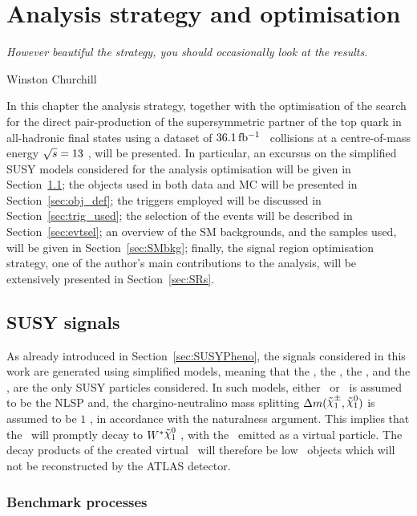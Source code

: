 \chapter{Analysis strategy and optimisation}
\label{ch:stop_ana}
\epigraph{\emph{However beautiful the strategy, you should occasionally look at the results.}}{Winston Churchill}

	In this chapter the analysis strategy, together with the optimisation of the search for the direct pair-production of the supersymmetric partner of the top quark in all-hadronic final states using a dataset of $36.1\, \mbox{fb$^{-1}$}$ \pp\ collisions at a centre-of-mass energy $\sqrt{s} = 13$ \TeV, will be presented. In particular, an excursus on the simplified \ac{SUSY} models considered for the analysis optimisation will be given in Section~\ref{sec:susysig}; the objects used in both data and \ac{MC} will be presented in Section~\ref{sec:obj_def}; the triggers employed will be discussed in Section~\ref{sec:trig_used}; the selection of the events will be described in Section~\ref{sec:evtsel}; an overview of the \ac{SM} backgrounds, and the samples used, will be given in Section~\ref{sec:SMbkg}; finally, the signal region optimisation strategy, one of the author's main contributions to the analysis, will be extensively presented in Section~\ref{sec:SRs}.


	\section{SUSY signals}
	\label{sec:susysig}

		As already introduced in Section~\ref{sec:SUSYPheno}, the signals considered in this work are generated using simplified models, meaning that the \stop, the \ninoone, the \ninotwo, and the \chinoonepm, are the only \ac{SUSY} particles considered. In such models, either \ninotwo\ or \chinoonepm\ is assumed to be the \ac{NLSP} and, the chargino-neutralino mass splitting $\Delta m(\chinoonepm, \ninoone)$ is assumed to be $1$ \GeV, in accordance with the naturalness argument. This implies that the \chinoonepm\ will promptly decay to $\Wboson^*\ninoone$ , with the \Wboson\ emitted as a virtual particle. The decay products of the created virtual \Wboson\ will therefore be low \pt\ objects which will not be reconstructed by the \ac{ATLAS} detector. 

		\subsection{Benchmark processes}

